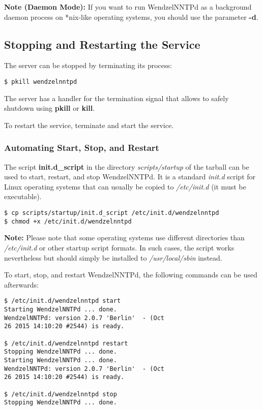 \documentclass[12pt,fleqn,leqno]{scrbook}
\begin{document}
\textbf{Note (Daemon Mode):} If you want to run WendzelNNTPd as a
background daemon process on *nix-like operating systems, you should use
the parameter \textbf{-d}.

\hypertarget{stopping-and-restarting-the-service}{%
\subsection{Stopping and Restarting the
Service}\label{stopping-and-restarting-the-service}}

The server can be stopped by terminating its process:

\begin{verbatim}
$ pkill wendzelnntpd
\end{verbatim}

The server has a handler for the termination signal that allows to
safely shutdown using \textbf{pkill} or \textbf{kill}.

To restart the service, terminate and start the service.

\hypertarget{automating-start-stop-and-restart}{%
\subsubsection{Automating Start, Stop, and
Restart}\label{automating-start-stop-and-restart}}

The script \textbf{init.d\_script} in the directory
\emph{scripts/startup} of the tarball can be used to start, restart, and
stop WendzelNNTPd. It is a standard \emph{init.d} script for Linux
operating systems that can usually be copied to \emph{/etc/init.d} (it
must be executable).

\begin{verbatim}
$ cp scripts/startup/init.d_script /etc/init.d/wendzelnntpd
$ chmod +x /etc/init.d/wendzelnntpd
\end{verbatim}

\textbf{Note:} Please note that some operating systems use different
directories than \emph{/etc/init.d} or other startup script formats. In
such cases, the script works nevertheless but should simply be installed
to \emph{/usr/local/sbin} instead.

To start, stop, and restart WendzelNNTPd, the following commands can be
used afterwards:

\begin{verbatim}
$ /etc/init.d/wendzelnntpd start
Starting WendzelNNTPd ... done.
WendzelNNTPd: version 2.0.7 'Berlin'  - (Oct
26 2015 14:10:20 #2544) is ready.

$ /etc/init.d/wendzelnntpd restart
Stopping WendzelNNTPd ... done.
Starting WendzelNNTPd ... done.
WendzelNNTPd: version 2.0.7 'Berlin'  - (Oct
26 2015 14:10:20 #2544) is ready.

$ /etc/init.d/wendzelnntpd stop
Stopping WendzelNNTPd ... done.
\end{verbatim}
\end{document}

